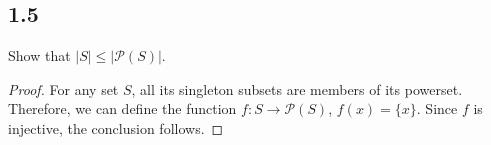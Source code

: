 \subsection*{1.5} Show that $|S| \leq |\mathcal{P}(S)|$.

\begin{proof}
For any set $S$, all its singleton subsets are members of its powerset. Therefore, we can define the function $f: S \rightarrow \mathcal{P}(S)$, $f(x) = \{x\}$. Since $f$ is injective, the conclusion follows.
\end{proof}

